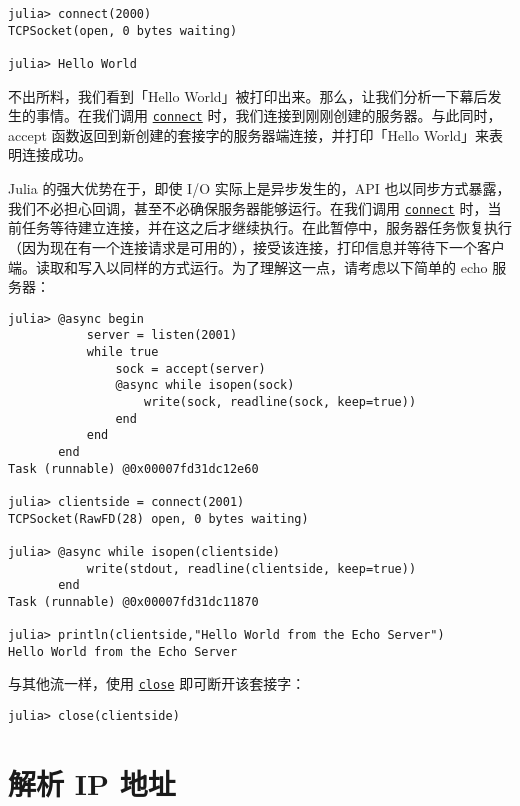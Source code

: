 \begin{verbatim}
julia> connect(2000)
TCPSocket(open, 0 bytes waiting)

julia> Hello World
\end{verbatim}



不出所料，我们看到「Hello World」被打印出来。那么，让我们分析一下幕后发生的事情。在我们调用 \hyperlink{9743233285520657275}{\texttt{connect}} 时，我们连接到刚刚创建的服务器。与此同时，accept 函数返回到新创建的套接字的服务器端连接，并打印「Hello World」来表明连接成功。



Julia 的强大优势在于，即使 I/O 实际上是异步发生的，API 也以同步方式暴露，我们不必担心回调，甚至不必确保服务器能够运行。在我们调用 \hyperlink{9743233285520657275}{\texttt{connect}} 时，当前任务等待建立连接，并在这之后才继续执行。在此暂停中，服务器任务恢复执行（因为现在有一个连接请求是可用的），接受该连接，打印信息并等待下一个客户端。读取和写入以同样的方式运行。为了理解这一点，请考虑以下简单的 echo 服务器：




\begin{verbatim}
julia> @async begin
           server = listen(2001)
           while true
               sock = accept(server)
               @async while isopen(sock)
                   write(sock, readline(sock, keep=true))
               end
           end
       end
Task (runnable) @0x00007fd31dc12e60

julia> clientside = connect(2001)
TCPSocket(RawFD(28) open, 0 bytes waiting)

julia> @async while isopen(clientside)
           write(stdout, readline(clientside, keep=true))
       end
Task (runnable) @0x00007fd31dc11870

julia> println(clientside,"Hello World from the Echo Server")
Hello World from the Echo Server
\end{verbatim}



与其他流一样，使用 \hyperlink{5331333469799487255}{\texttt{close}} 即可断开该套接字：




\begin{verbatim}
julia> close(clientside)
\end{verbatim}



\hypertarget{8798664283149579111}{}


\section{解析 IP 地址}



